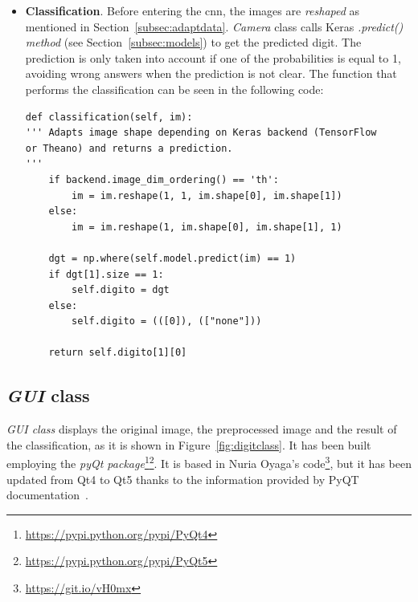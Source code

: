 \begin{itemize}
\begin{lstlisting}[frame=single]
	im_res = cv2.resize(im_blur, (28, 28))
	
	# Edge extraction.
	im_sobel_x = cv2.Sobel(im_res, cv2.CV_32F, 1, 0, ksize=5)
	im_sobel_y = cv2.Sobel(im_res, cv2.CV_32F, 0, 1, ksize=5)
	im_edges = cv2.add(abs(im_sobel_x), abs(im_sobel_y))
	im_edges = cv2.normalize(im_edges, None, 0, 255, cv2.NORM_MINMAX)
	im_edges = np.uint8(im_edges)
	
	return im_edges
\end{lstlisting}
	
	\item \textbf{Classification}. Before entering the \gls{cnn}, the images are \emph{reshaped} as mentioned in Section~\ref{subsec:adaptdata}. \textit{Camera} class calls Keras \emph{\textit{.predict()} method} (see Section~\ref{subsec:models}) to get the predicted digit. The prediction is only taken into account if one of the probabilities is equal to 1, avoiding wrong answers when the prediction is not clear. The function that performs the classification can be seen in the following code:
\begin{lstlisting}
def classification(self, im):
''' Adapts image shape depending on Keras backend (TensorFlow
or Theano) and returns a prediction.
'''
	if backend.image_dim_ordering() == 'th':
		im = im.reshape(1, 1, im.shape[0], im.shape[1])            
	else:      
		im = im.reshape(1, im.shape[0], im.shape[1], 1)            
	
	dgt = np.where(self.model.predict(im) == 1)
	if dgt[1].size == 1:
		self.digito = dgt
	else:
		self.digito = (([0]), (["none"]))
	
	return self.digito[1][0]
\end{lstlisting}
\end{itemize}

\subsection{\textit{GUI} class}
\emph{\textit{GUI} class} displays the original image, the preprocessed image and the result of the classification, as it is shown in Figure~\ref{fig:digitclass}. It has been built employing the \emph{pyQt package}\footnote{\url{https://pypi.python.org/pypi/PyQt4}}\footnote{\url{https://pypi.python.org/pypi/PyQt5}}. It is based in Nuria Oyaga's code\footnote{\url{https://git.io/vH0mx}}, but it has been updated from Qt4 to Qt5 thanks to the information provided by PyQT documentation~\cite{pyqt5}.

